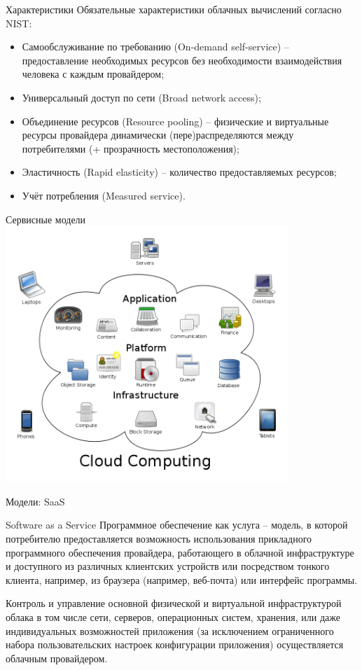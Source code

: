 \begin{frame}{Характеристики}
	Обязательные характеристики облачных вычислений согласно NIST:

	\begin{itemize}
		\item Самообслуживание по требованию (On-demand self-service) -- предоставление необходимых ресурсов без необходимости взаимодействия человека с каждым провайдером;
		\item Универсальный доступ по сети (Broad network access);
		\item Объединение ресурсов (Resource pooling) -- физические и виртуальные ресурсы провайдера динамически (пере)распределяются между потребителями (+ прозрачность местоположения);
		\item Эластичность (Rapid elasticity) -- количество предоставляемых ресурсов;
		\item Учёт потребления (Measured service).
	\end{itemize}
\end{frame}

\begin{frame}{Сервисные модели}
	\center
	\includegraphics[width=0.8\textwidth]{Cloud_computing.png}
\end{frame}


\begin{frame}{Модели: SaaS}
	\begin{block}{Software as a Service}
		Программное обеспечение как услуга -- модель,  в которой потребителю предоставляется возможность использования прикладного программного обеспечения провайдера,  работающего в облачной инфраструктуре и доступного из различных клиентских устройств или посредством тонкого клиента,  например,  из браузера (например,  веб-почта) или интерфейс программы.

		\bigskip
		Контроль и управление основной физической и виртуальной инфраструктурой облака в том числе сети,  серверов,  операционных систем,  хранения,  или даже индивидуальных возможностей приложения (за исключением ограниченного набора пользовательских настроек конфигурации приложения) осуществляется облачным провайдером.
	\end{block}
\end{frame}

